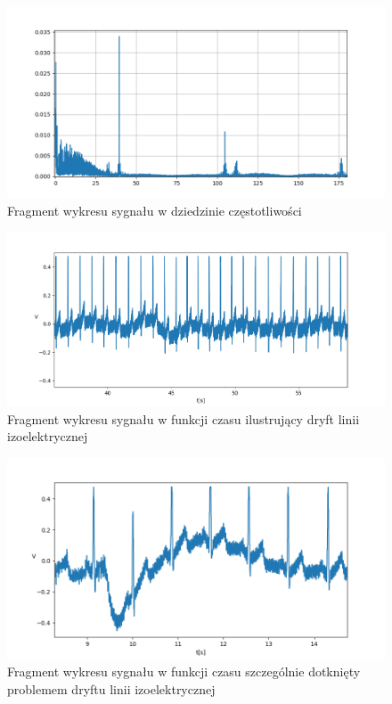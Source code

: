 \begin{figure}[h!]
    \centering 
    \includegraphics[scale=0.6]{pl/media/fft_raw.png}
    \caption{Fragment wykresu sygnału w dziedzinie częstotliwości}
    \label{fig:fftraw}
\end{figure}

\begin{figure}[h!]
    \centering 
    \includegraphics[scale=0.6]{pl/media/baseline_wander.png}
    \caption{Fragment wykresu sygnału w funkcji czasu ilustrujący dryft linii izoelektrycznej}
    \label{fig:baselinewander}
\end{figure}

\newpage

\begin{figure}[h!]
    \centering 
    \includegraphics[scale=0.6]{pl/media/wander_2.png}
    \caption{Fragment wykresu sygnału w funkcji czasu szczególnie dotknięty problemem dryftu linii izoelektrycznej}
    \label{fig:wander2}
\end{figure}

